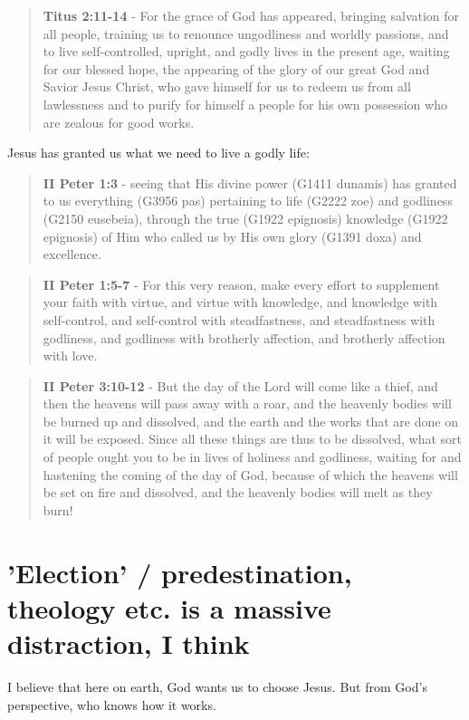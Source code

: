 \documentclass[11pt]{article}
\begin{document}
\begin{quote}
\textbf{Titus 2:11-14} - For the grace of God has appeared, bringing salvation for all people, training us to renounce ungodliness and worldly passions, and to live self-controlled, upright, and godly lives in the present age, waiting for our blessed hope, the appearing of the glory of our great God and Savior Jesus Christ, who gave himself for us to redeem us from all lawlessness and to purify for himself a people for his own possession who are zealous for good works.
\end{quote}

Jesus has granted us what we need to live a godly life:

\begin{quote}
\textbf{II Peter 1:3} - seeing that His divine power (G1411 dunamis) has granted to us everything (G3956 pas) pertaining to life (G2222 zoe) and godliness (G2150 eusebeia), through the true (G1922 epignosis) knowledge (G1922 epignosis) of Him who called us by His own glory (G1391 doxa) and excellence.
\end{quote}

\begin{quote}
\textbf{II Peter 1:5-7} - For this very reason, make every effort to supplement your faith with virtue, and virtue with knowledge, and knowledge with self-control, and self-control with steadfastness, and steadfastness with godliness, and godliness with brotherly affection, and brotherly affection with love.
\end{quote}

\begin{quote}
\textbf{II Peter 3:10-12} - But the day of the Lord will come like a thief, and then the heavens will pass away with a roar, and the heavenly bodies will be burned up and dissolved, and the earth and the works that are done on it will be exposed. Since all these things are thus to be dissolved, what sort of people ought you to be in lives of holiness and godliness, waiting for and hastening the coming of the day of God, because of which the heavens will be set on fire and dissolved, and the heavenly bodies will melt as they burn!
\end{quote}

\section{'Election' / predestination, theology etc. is a massive distraction, I think}
\label{sec:orgd6f9fe4}
I believe that here on earth, God wants us to choose Jesus. But from God's perspective, who knows how it works.
\end{document}
